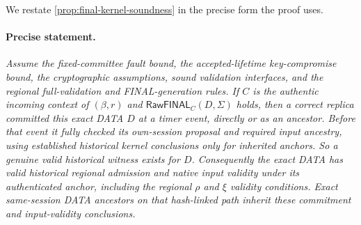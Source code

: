 \documentclass[11pt,a4paper]{article}
\newcommand{\tagg}[1]{\ensuremath{\mathsf{#1}}}
\begin{document}
We restate \cref{prop:final-kernel-soundness} in the precise form the
proof uses.

\paragraph{Precise statement.}
\textit{Assume the fixed-committee fault bound, the accepted-lifetime
key-compromise bound, the cryptographic assumptions, sound validation
interfaces, and the regional full-validation and FINAL-generation rules.
If $C$ is the authentic incoming context of $(\beta,r)$ and
$\tagg{RawFINAL}_C(D,\Sigma)$ holds, then a correct replica committed
this exact DATA $D$ at a timer event, directly or as an ancestor. Before
that event it fully checked its own-session proposal and required input
ancestry, using established historical kernel conclusions only for
inherited anchors. So a genuine valid historical witness exists for $D$.
Consequently the exact DATA has valid historical regional admission and
native input validity under its authenticated anchor, including the
regional $\rho$ and $\xi$ validity conditions. Exact same-session DATA
ancestors on that hash-linked path inherit these commitment and
input-validity conclusions.}
\end{document}
